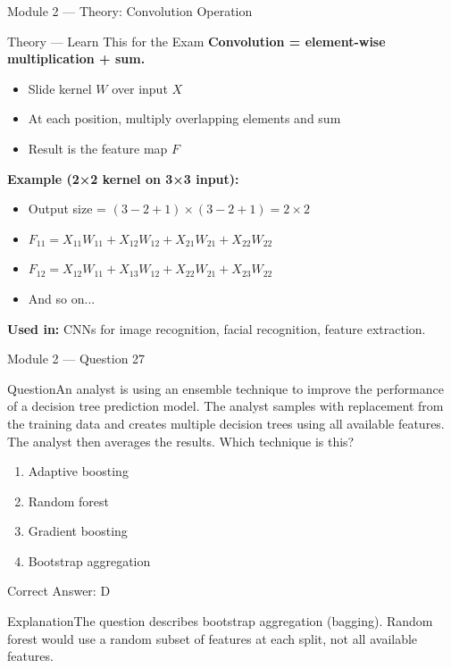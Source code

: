 \documentclass[aspectratio=169,10pt]{beamer}
\newcommand{\question}[1]{\begin{block}{Question}#1\end{block}}
\newcommand{\options}[4]{%
	\begin{enumerate}[label=\Alph*.,leftmargin=*]
		\item #1
		\item #2
		\item #3
		\item #4
	\end{enumerate}
}
\newcommand{\answerbox}[1]{\begin{exampleblock}{Correct Answer: #1}\end{exampleblock}}
\newcommand{\explain}[1]{\begin{block}{Explanation}#1\end{block}}
\newcommand{\theory}[1]{%
	\begin{block}{Theory --- Learn This for the Exam}
		\small #1
	\end{block}
}
\begin{document}
	\begin{frame}{Module 2 --- Theory: Convolution Operation}
		\theory{
			\textbf{Convolution = element-wise multiplication + sum.}
			\begin{itemize}
				\item Slide kernel $W$ over input $X$
				\item At each position, multiply overlapping elements and sum
				\item Result is the feature map $F$
			\end{itemize}
			\textbf{Example (2×2 kernel on 3×3 input):}
			\begin{itemize}
				\item Output size = $(3-2+1) \times (3-2+1) = 2 \times 2$
				\item $F_{11} = X_{11}W_{11} + X_{12}W_{12} + X_{21}W_{21} + X_{22}W_{22}$
				\item $F_{12} = X_{12}W_{11} + X_{13}W_{12} + X_{22}W_{21} + X_{23}W_{22}$
				\item And so on...
			\end{itemize}
			\textbf{Used in:} CNNs for image recognition, facial recognition, feature extraction.
		}
	\end{frame}
	
	\begin{frame}{Module 2 --- Question 27}
		\question{An analyst is using an ensemble technique to improve the performance of a decision tree prediction model. The analyst samples with replacement from the training data and creates multiple decision trees using all available features. The analyst then averages the results. Which technique is this?}
		\options{Adaptive boosting}{Random forest}{Gradient boosting}{Bootstrap aggregation}
		\answerbox{D}
		\explain{The question describes bootstrap aggregation (bagging). Random forest would use a random subset of features at each split, not all available features.}
	\end{frame}
	
\end{document}

